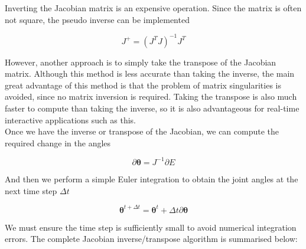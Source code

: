 \documentclass[paper=a4, fontsize=11pt]{scrartcl} %
\numberwithin{equation}{section} %
\numberwithin{figure}{section} %
\numberwithin{table}{section} %
\newcommand{\params}{\boldsymbol{\theta}}
\begin{document}
Inverting the Jacobian matrix is an expensive operation. Since the matrix is often not square, the pseudo inverse can be implemented

\begin{equation}
J^+ = (J^TJ)^{-1}J^T
\end{equation}

However, another approach is to simply take the transpose of the Jacobian matrix. Although this method is less accurate than taking the inverse, the main great advantage of this method is that the problem of matrix singularities is avoided, since no matrix inversion is required. Taking the transpose is also much faster to compute than taking the inverse, so it is also advantageous for real-time interactive applications such as this. \\

Once we have the inverse or transpose of the Jacobian, we can compute the required change in the angles

\begin{equation}
\partial \params = J^{-1} \partial E
\end{equation}

And then we perform a simple Euler integration to obtain the joint angles at the next time step $\Delta t$

\begin{equation}
\params^{t+\Delta t} = \params^t + \Delta t \partial \params
\end{equation}

We must ensure the time step is sufficiently small to avoid numerical integration errors. The complete Jacobian inverse/transpose algorithm is summarised below:
\end{document}

